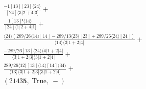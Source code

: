 \documentclass[varwidth, border=5pt]{standalone}
\begin{document}
\begin{my}
$\begin{gathered}
\scriptscriptstyle\frac{-1[13][23]⟨24⟩}{[24]⟨3|2+4|3]} +\\
\scriptscriptstyle\frac{1[13]²⟨14⟩}{[24]⟨1|2+4|1]} +\\
\scriptscriptstyle\frac{⟨24⟩(289/26⟨14⟩[14]-289/13⟨23⟩[23]+289/26⟨24⟩[24])}{⟨13⟩⟨3|1+2|4]} +\\
\scriptscriptstyle\frac{-289/26[13]⟨24⟩⟨4|1+2|4]}{⟨3|1+2|3]⟨3|1+2|4]} +\\
\scriptscriptstyle\frac{289/26⟨12⟩[13]⟨14⟩[14]⟨34⟩}{⟨13⟩⟨3|1+2|3]⟨3|1+2|4]} +\\
\scriptscriptstyle(2143𝟓,\;\text{True},\;-) \phantom{+}
\end{gathered}$
\end{my}
\end{document}
